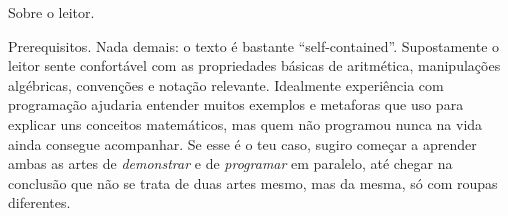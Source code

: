 \endsectionoid

\sectionoid Sobre o leitor.

\blah Prerequisitos.
Nada demais: o texto é bastante ``self-contained''.
Supostamente o leitor sente confortável com as propriedades básicas
de aritmética, manipulações algébricas, convenções e notação relevante.
Idealmente experiência com programação ajudaria entender muitos exemplos
e metaforas que uso para explicar uns conceitos matemáticos, mas quem
não programou nunca na vida ainda consegue acompanhar.
Se esse é o teu caso, sugiro começar a aprender ambas as artes de
\emph{demonstrar} e de \emph{programar} em paralelo, até chegar
na conclusão que não se trata de duas artes mesmo, mas da mesma,
só com roupas diferentes.

\endsectionoid

\endchapteroid
